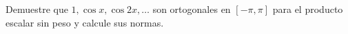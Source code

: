 Demuestre que $1,\cos x,\cos2x,\ldots$ son ortogonales en $[-\pi,\pi]$ para el producto escalar sin peso y calcule sus normas.
